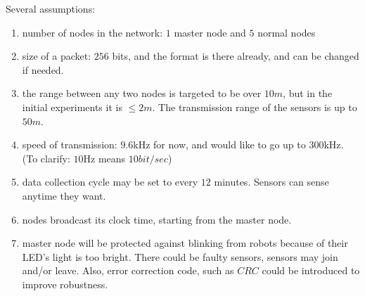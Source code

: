 \documentclass[11pt,letter]{article}
\begin{document}
Several assumptions: %
\begin{enumerate}
    \item number of nodes in the network: $1$ master node and $5$ normal nodes
    \item size of a packet: $256$ bits, and the format is there already, and can be changed if needed.
    \item the range between any two nodes is targeted to be over $10m$, but in the initial experiments it is $\le 2m$. The transmission range of the sensors is up to $50m$.
    \item speed of transmission: $9.6$kHz for now, and would like to go up to $300$kHz. (To clarify: $10$Hz means $10bit/sec$)
    \item data collection cycle may be set to every $12$ minutes. Sensors can sense anytime they want.
    \item nodes broadcast its clock time, starting from the master node.
    \item master node will be protected against blinking from robots because of their LED's light is too bright. There could be faulty sensors, sensors may join and/or leave. Also, error correction code, such as $CRC$ could be introduced to improve robustness.
\end{enumerate}

% 
% 
% 
% 	
\end{document}
